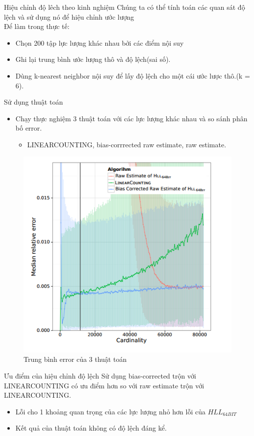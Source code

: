 \documentclass{beamer}
\newcommand{\bi}{\begin{itemize}}
\newcommand{\ei}{\end{itemize}}
\begin{document}
\begin{frame}{Hiệu chỉnh độ lêch theo kinh nghiệm}
Chúng ta có thể tính toán các quan sát độ lệch và sử dụng nó để hiệu chỉnh ước lượng \\ 

Để làm trong thực tế:
\bi
\item Chọn 200 tập lực lượng khác nhau bởi các điểm nội suy
\item Ghi lại trung bình ước lượng thô và độ lệch(sai số).
\item Dùng k-nearest neighbor nội suy để lấy độ lệch cho một cái ước lược thô.(k = 6).
\ei
\end{frame}
\begin{frame}{Sử dụng thuật toán}
\begin{itemize}
\item Chạy thực nghiệm 3 thuật toán với các lực lượng khác nhau và so sánh phân bố error.
\bi
\item LINEARCOUNTING, bias-corrrected raw estimate, raw estimate.
\ei
\end{itemize}
\begin{figure}[h]
\includegraphics[scale=0.5]{img2.png}
\caption{Trung bình error của 3 thuật toán}
\end{figure}
\end{frame}
\begin{frame}{Ưu điểm của hiệu chỉnh độ lệch}
Sử dụng bias-corrected trộn với LINEARCOUNTING có ưu điểm hơn so với raw estimate trộn với LINEARCOUNTING.
\begin{itemize}
\item Lỗi cho 1 khoảng quan trọng của các lực lượng nhỏ hơn lỗi của $HLL_{64BIT}$
\item Kết quả của thuật toán không có độ lệch đáng kể.

\end{itemize} 
\end{frame}
\end{document}
